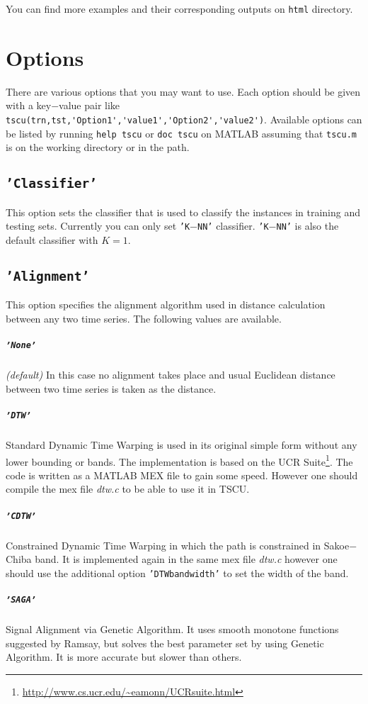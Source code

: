 \documentclass{article}
\newcommand{\parametre}[1]{\texttt{#1}}
\begin{document}
You can find more examples and their corresponding outputs on \verb|html| directory.
\section{Options}
There are various options that you may want to use. 
Each option should be given with a key$-$value pair like \verb|tscu(trn,tst,'Option1','value1','Option2','value2')|. 
Available options can be listed by running \parametre{help tscu} or \parametre{doc tscu} on MATLAB assuming that \parametre{tscu.m} is on the working directory or in the path.

\subsection{\parametre{'Classifier'}}
This option sets the classifier that is used to classify the instances in training and testing sets. Currently you can only set \parametre{'K$-$NN'} classifier. \parametre{'K$-$NN'} is also the default classifier with $K=1$.

\subsection{\parametre{'Alignment'}} 
This option specifies the alignment algorithm used in distance calculation between any two time series. The following values are available.

\subparagraph*{\parametre{'None'}} \textit{ (default)} In this case no alignment takes place and usual Euclidean distance between two time series is taken as the distance.

\subparagraph*{\parametre{'DTW'}} Standard Dynamic Time Warping is used in its original simple form without any lower bounding or bands. 
The implementation is based on the UCR Suite\footnote{\url{http://www.cs.ucr.edu/~eamonn/UCRsuite.html}}.\@
The code is written as a MATLAB MEX file to gain some speed. However one should compile the mex file \textit{dtw.c} to be able to use it in TSCU.\@

\subparagraph*{\parametre{'CDTW'}} Constrained Dynamic Time Warping in which the path is constrained in Sakoe$-$Chiba band. It is implemented again in the same mex file \textit{dtw.c} however one should use the additional option \parametre{'DTWbandwidth'} to set the width of the band.

\subparagraph*{\parametre{'SAGA'}} Signal Alignment via Genetic Algorithm. It uses smooth monotone functions suggested by Ramsay\cite{Ramsay1998}, but solves the best parameter set by using Genetic Algorithm\cite{Kaya2013113}. It is more accurate but slower than others.
\end{document}
